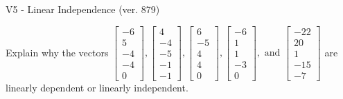 \begin{exercise}
  \begin{exerciseTitle}V5 - Linear Independence (ver. 879)\end{exerciseTitle}
  \begin{exerciseStatement}
    Explain why the vectors \(\left[\begin{array}{r}
-6 \\
5 \\
-4 \\
-4 \\
0
\end{array}\right] , \left[\begin{array}{r}
4 \\
-4 \\
-5 \\
-1 \\
-1
\end{array}\right] , \left[\begin{array}{r}
6 \\
-5 \\
4 \\
4 \\
0
\end{array}\right] , \left[\begin{array}{r}
-6 \\
1 \\
1 \\
-3 \\
0
\end{array}\right] , \text{ and } \left[\begin{array}{r}
-22 \\
20 \\
1 \\
-15 \\
-7
\end{array}\right]\) are linearly dependent or linearly independent.	



\end{exerciseStatement}
\end{exercise}
